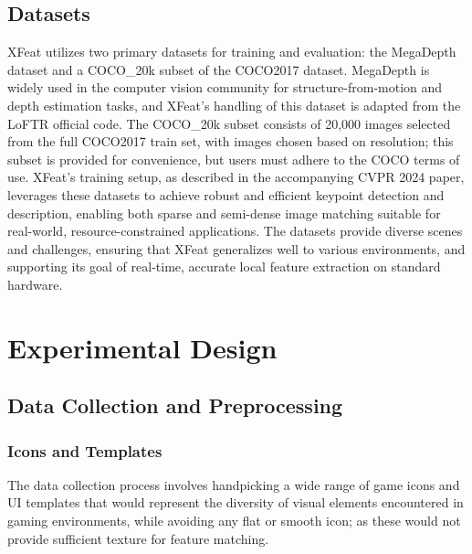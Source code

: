 \subsection{Datasets}
XFeat utilizes two primary datasets for training and evaluation: the MegaDepth
dataset and a COCO\_20k subset of the COCO2017 dataset. MegaDepth is widely
used in the computer vision community for structure-from-motion and depth
estimation tasks, and XFeat's handling of this dataset is adapted from the
LoFTR official code. The COCO\_20k subset consists of 20,000 images selected
from the full COCO2017 train set, with images chosen based on resolution; this
subset is provided for convenience, but users must adhere to the COCO terms of
use. XFeat's training setup, as described in the accompanying CVPR 2024 paper,
leverages these datasets to achieve robust and efficient keypoint detection and
description, enabling both sparse and semi-dense image matching suitable for
real-world, resource-constrained applications. The datasets provide diverse
scenes and challenges, ensuring that XFeat generalizes well to various
environments, and supporting its goal of real-time, accurate local feature
extraction on standard hardware.
\section{Experimental Design}
\subsection{Data Collection and Preprocessing}
\subsubsection{Icons and Templates}
The data collection process involves handpicking a wide range of game icons and
UI templates that would represent the diversity of visual elements encountered
in gaming environments, while avoiding any flat or smooth icon; as these would
not provide sufficient texture for feature matching.

